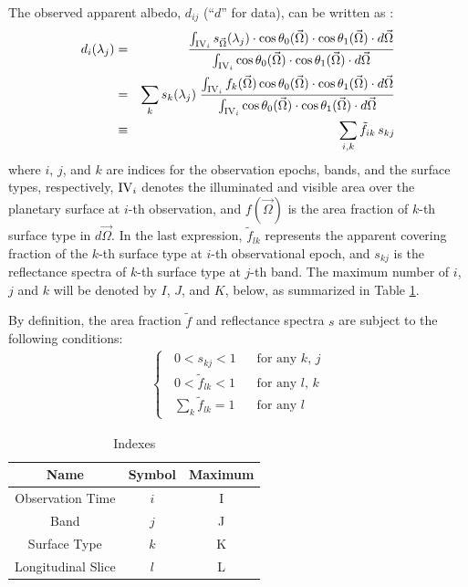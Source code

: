 \documentclass[iop,numberedappendix,apj,]{emulateapj}
\def\fast{\tilde f}
\begin{document}
The observed apparent albedo, $d_{ij}$ (``$d$'' for data), can be written as \citep[see][]{Fujii2010}: 
\begin{eqnarray}
d_{i} (\lambda_j) &=& \displaystyle \frac{ \int_{{\rm IV}_i} s_{\vec \Omega }(\lambda_j) \cdot \cos \theta_0 ({\vec \Omega}) \cdot \cos \theta_1 ({\vec \Omega}) \cdot d\vec \Omega }{ \int_{{\rm IV}_i}  \cos \theta_0 ({\vec \Omega}) \cdot \cos \theta_1 ({\vec \Omega}) \cdot d\vec \Omega } \\
&=& \sum _{k} s_k (\lambda_j) \; \displaystyle \frac{ \int_{{\rm IV}_{i}} f_k (\vec \Omega ) \cos \theta_0 ({\vec \Omega}) \cdot \cos \theta_1 ({\vec \Omega}) \cdot d\vec \Omega }{ \int_{{\rm IV}_i}  \cos \theta_0 ({\vec \Omega}) \cdot \cos \theta_1 ({\vec \Omega}) \cdot d\vec \Omega } \\
&\equiv & \sum _{i,k} \fast_{ik} \, s_{kj} \label{eq:d_f_ast_s}
\end{eqnarray}
where $i$, $j$, and $k$ are indices for the observation epochs, bands, and the surface types, respectively, ${\rm IV }_i$ denotes the illuminated and visible area over the planetary surface at $i$-th observation, and $f (\vec \Omega )$ is the area fraction of $k$-th surface type in $d\vec \Omega$. 
In the last expression, $\fast_{lk}$ represents the apparent covering fraction of the $k$-th surface type at $i$-th observational epoch, and 
$s_{kj}$ is the reflectance spectra of $k$-th surface type at $j$-th band. 
The maximum number of $i$, $j$ and $k$ will be denoted by $I$, $J$, and $K$, below, as summarized in Table \ref{tab:index}. 

By definition, the area fraction $\fast $ and reflectance spectra $s$ are subject to the following conditions:
\begin{eqnarray}
\begin{cases}
\;\; 0 < s_{kj} < 1 \;\;\; & \mbox{for any $k$, $j$} \\
\;\; 0 < \fast_{lk} < 1 \;\;\; & \mbox{for any $l$, $k$} \label{eq:cond_f_ast}\\
\;\; \sum_k \fast_{lk} = 1 & \mbox{for any $l$} 
\end{cases}
\end{eqnarray}


\begin{table}[tbh]
\caption{Indexes}
\begin{center}
\begin{tabular}{ccc} \hline \hline
Name & Symbol & Maximum \\ \hline
Observation Time & $i$ & I \\
Band & $j$ & J  \\
Surface Type & $k$ & K  \\
Longitudinal Slice  & $l$ & L \\ \hline
\end{tabular}
\end{center}
\label{tab:index}
\end{table}%
\end{document}
